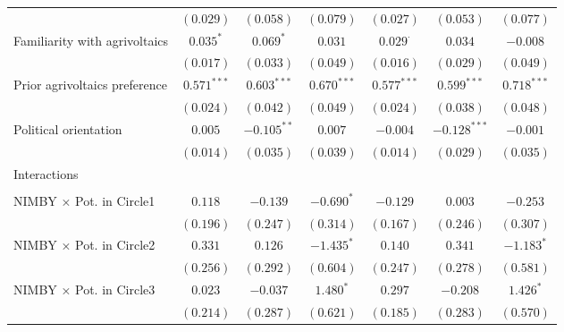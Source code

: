 \begin{center}
\begin{small}
\begin{longtable}{l@{} c@{} c@{} c@{} c@{} c@{} c@{}}
                                    & $(0.029)$        & $(0.058)$     & $(0.079)$     & $(0.027)$       & $(0.053)$      & $(0.077)$      \\
\quad Familiarity with agrivoltaics & $0.035^{*}$      & $0.069^{*}$   & $0.031$       & $0.029^{\cdot}$ & $0.034$        & $-0.008$       \\
                                    & $(0.017)$        & $(0.033)$     & $(0.049)$     & $(0.016)$       & $(0.029)$      & $(0.049)$      \\
\quad Prior agrivoltaics preference & $0.571^{***}$    & $0.603^{***}$ & $0.670^{***}$ & $0.577^{***}$   & $0.599^{***}$  & $0.718^{***}$  \\
                                    & $(0.024)$        & $(0.042)$     & $(0.049)$     & $(0.024)$       & $(0.038)$      & $(0.048)$      \\
\quad Political orientation         & $0.005$          & $-0.105^{**}$ & $0.007$       & $-0.004$        & $-0.128^{***}$ & $-0.001$       \\
                                    & $(0.014)$        & $(0.035)$     & $(0.039)$     & $(0.014)$       & $(0.029)$      & $(0.035)$      \\
Interactions                        &                  &               &               &                 &                &                \\
                                    &                  &               &               &                 &                &                \\
\quad NIMBY × Pot. in Circle1       & $0.118$          & $-0.139$      & $-0.690^{*}$  & $-0.129$        & $0.003$        & $-0.253$       \\
                                    & $(0.196)$        & $(0.247)$     & $(0.314)$     & $(0.167)$       & $(0.246)$      & $(0.307)$      \\
\quad NIMBY × Pot. in Circle2       & $0.331$          & $0.126$       & $-1.435^{*}$  & $0.140$         & $0.341$        & $-1.183^{*}$   \\
                                    & $(0.256)$        & $(0.292)$     & $(0.604)$     & $(0.247)$       & $(0.278)$      & $(0.581)$      \\
\quad NIMBY × Pot. in Circle3       & $0.023$          & $-0.037$      & $1.480^{*}$   & $0.297$         & $-0.208$       & $1.426^{*}$    \\
                                    & $(0.214)$        & $(0.287)$     & $(0.621)$     & $(0.185)$       & $(0.283)$      & $(0.570)$      \\

\end{longtable}
\end{small}
\end{center}
